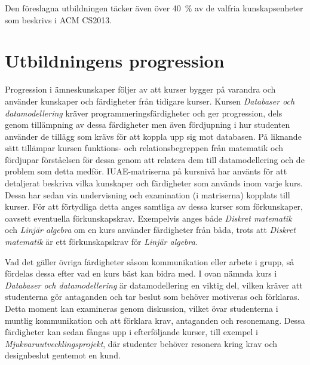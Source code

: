 Den föreslagna utbildningen täcker även över 40~\% av de valfria kunskapsenheter som beskrivs i ACM CS2013.


\section{Utbildningens progression}

Progression i ämneskunskaper följer av att kurser bygger på varandra och använder kunskaper och färdigheter från tidigare kurser. Kursen \emph{Databaser och datamodellering} kräver programmeringsfärdigheter och ger progression, dels genom tillämpning av dessa färdigheter men även fördjupning i hur studenten använder de tillägg som krävs för att koppla upp sig mot databasen. På liknande sätt tillämpar kursen funktions- och relationsbegreppen från matematik och fördjupar förståelsen för dessa genom att relatera dem till datamodellering och de problem som detta medför. IUAE-matriserna på kursnivå har använts för att detaljerat beskriva vilka kunskaper och färdigheter som används inom varje kurs. Dessa har sedan via undervisning och examination (i matriserna) kopplats till kurser. För att förtydliga detta anges samtliga av dessa kurser som förkunskaper, oavsett eventuella förkunskapskrav. Exempelvis anges både \emph{Diskret matematik} och \emph{Linjär algebra} om en kurs använder färdigheter från båda, trots att \emph{Diskret matematik} är ett förkunskapskrav för \emph{Linjär algebra}.

Vad det gäller övriga färdigheter såsom kommunikation eller arbete i grupp, så fördelas dessa efter vad en kurs bäst kan bidra med. I ovan nämnda kurs i \emph{Databaser och datamodellering} är datamodellering en viktig del, vilken kräver att studenterna gör antaganden och tar beslut som behöver motiveras och förklaras. Detta moment kan examineras genom diskussion, vilket övar studenterna i muntlig kommunikation och att förklara krav, antaganden och resonemang. Dessa färdigheter kan sedan fångas upp i efterföljande kurser, till exempel i \emph{Mjukvaruutvecklingsprojekt}, där studenter behöver resonera kring krav och designbeslut gentemot en kund.

